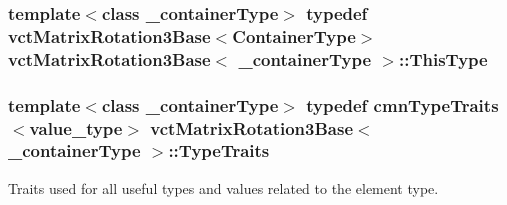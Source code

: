 \subsubsection[{This\+Type}]{\setlength{\rightskip}{0pt plus 5cm}template$<$class \+\_\+container\+Type$>$ typedef {\bf vct\+Matrix\+Rotation3\+Base}$<${\bf Container\+Type}$>$ {\bf vct\+Matrix\+Rotation3\+Base}$<$ \+\_\+container\+Type $>$\+::{\bf This\+Type}}\label{classvct_matrix_rotation3_base_a027be766cb10ca3c2ad8e85c28ed0af9}
\hypertarget{classvct_matrix_rotation3_base_aa759c028d73ab710d2e116ca08252719}{}
\subsubsection[{Type\+Traits}]{\setlength{\rightskip}{0pt plus 5cm}template$<$class \+\_\+container\+Type$>$ typedef {\bf cmn\+Type\+Traits}$<$value\+\_\+type$>$ {\bf vct\+Matrix\+Rotation3\+Base}$<$ \+\_\+container\+Type $>$\+::{\bf Type\+Traits}}\label{classvct_matrix_rotation3_base_aa759c028d73ab710d2e116ca08252719}
Traits used for all useful types and values related to the element type. 

